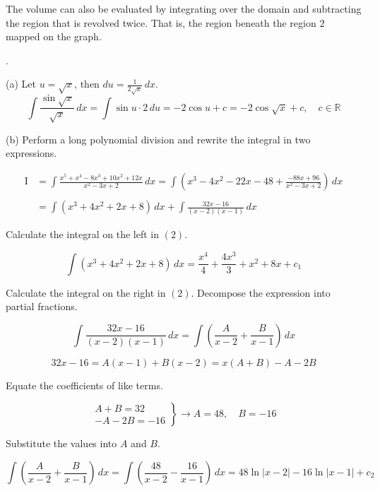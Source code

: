 \documentclass{article}
\begin{document}
\hfill

\noindent The volume can also be evaluated by integrating over the domain and subtracting the region that is revolved twice. That is, the region beneath the region $2$ mapped on the graph.

\hfill

.

\hfill

\noindent (a) Let $u=\sqrt x$, then $\displaystyle du=\frac1{2\sqrt x}\,dx$.
\[\int\frac{\sin\sqrt x}{\sqrt x}\,dx=\int\sin u\cdot2\,du=-2\cos u+c=\boxed{-2\cos\sqrt x+c,\quad c\in\mathbb{R}}\]

\hfill

\noindent (b) Perform a long polynomial division and rewrite the integral in two expressions.

\begin{align}\mathrm{I}&=\int\frac{x^5+x^4-8x^3+10x^2+12x}{x^2-3x+2}\,dx=\int\left(x^3-4x^2-22x-48+\frac{-88x+96}{x^2-3x+2}\right)\,dx\nonumber\\\nonumber\\&=\int\left(x^3+4x^2+2x+8\right)\,dx+\int\frac{32x-16}{(x-2)(x-1)}\,dx\end{align}

\hfill

\noindent Calculate the integral on the left in $(2)$.

\[\int\left(x^3+4x^2+2x+8\right)\,dx=\frac{x^4}4+\frac{4x^3}3+x^2+8x+c_1\]

\hfill

\noindent Calculate the integral on the right in $(2)$. Decompose the expression into partial fractions.

\[\int\frac{32x-16}{(x-2)(x-1)}\,dx=\int\left(\frac{A}{x-2}+\frac{B}{x-1}\right)\,dx\]

\[32x-16=A(x-1)+B(x-2)=x(A+B)-A-2B\]

\hfill

\noindent Equate the coefficients of like terms.

\[\left.\begin{array}{c}
A+B=32\\
-A-2B=-16 
\end{array}\right\}\rightarrow A=48,\quad B=-16\]

\hfill

\noindent Substitute the values into $A$ and $B$.

\[\int\left(\frac{A}{x-2}+\frac{B}{x-1}\right)\,dx=\int\left(\frac{48}{x-2}-\frac{16}{x-1}\right)\,dx=48\ln|x-2|-16\ln|x-1|+c_2\]
\end{document}

